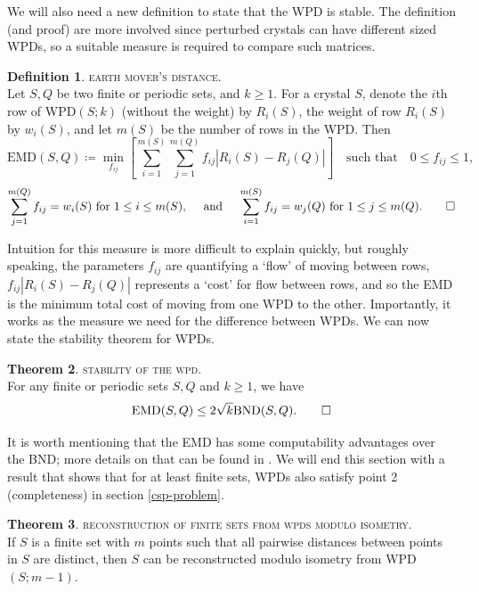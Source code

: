 \documentclass[11pt]{article}
\theoremstyle{definition}
\newtheorem{defi/}{Definition}[section]
\newenvironment{defi}
  {\renewcommand{\qedsymbol}{$\blacktriangleleft$}%
   \pushQED{\qed}\begin{defi/}}
  {\popQED\end{defi/}}
\newtheorem{theorem/}[defi/]{Theorem}
\newenvironment{theorem}
  {\renewcommand{\qedsymbol}{$\blacktriangleleft$}%
   \pushQED{\qed}\begin{theorem/}}
  {\popQED\end{theorem/}}
\begin{document}
We will also need a new definition to state that the WPD is stable. The definition (and proof) are more involved since perturbed crystals can have different sized WPDs, so a suitable measure is required to compare such matrices.

\begin{defi}\textsc{earth mover's distance.}\\
Let $S, Q$ be two finite or periodic sets, and $k\geq 1$. For a crystal $S$, denote the $i$th row of WPD$(S;k)$ (without the weight) by $R_i(S)$, the weight of row $R_i(S)$ by $w_i(S)$, and let $m(S)$ be the number of rows in the WPD. Then
\[
\text{EMD}(S,Q) \coloneqq \min_{f_{ij}}\left[\sum_{i=1}^{m(S)} \sum_{j=1}^{m(Q)} f_{ij}|R_i(S) - R_j(Q)| \right]\quad \text{such that}\quad  0\leq f_{ij} \leq 1,
\]
\[
\sum_{j=1}^{m(Q)} f_{ij} = w_i(S) \text{ for } 1\leq i\leq m(S), \quad \text{ and } \quad \sum_{i=1}^{m(S)} f_{ij} = w_j(Q) \text{ for } 1\leq j\leq m(Q).\qedhere
\]
\end{defi}

Intuition for this measure is more difficult to explain quickly, but roughly speaking, the parameters $f_{ij}$ are quantifying a `flow' of moving between rows, $f_{ij}|R_i(S)-R_j(Q)|$ represents a `cost' for flow between rows, and so the EMD is the minimum total cost of moving from one WPD to the other. Importantly, it works as the measure we need for the difference between WPDs. We can now state the stability theorem for WPDs.

\begin{theorem}\textsc{stability of the wpd.}\\
For any finite or periodic sets $S,Q$ and $k\geq 1$, we have 
\[
\text{EMD}(S,Q) \leq 2\sqrt{k}\text{BND}(S,Q).\qedhere
\]
\end{theorem}

It is worth mentioning that the EMD has some computability advantages over the BND; more details on that can be found in \cite{2020-Mosca-Kurlin}. We will end this section with a result that  shows that for at least finite sets, WPDs also satisfy point 2 (completeness) in section \ref{csp-problem}.

\begin{theorem}\textsc{reconstruction of finite sets from wpds modulo isometry.}\\
If $S$ is a finite set with $m$ points such that all pairwise distances between points in $S$ are distinct, then $S$ can be reconstructed modulo isometry from WPD$(S;m-1)$. 
\end{theorem}
\end{document}
